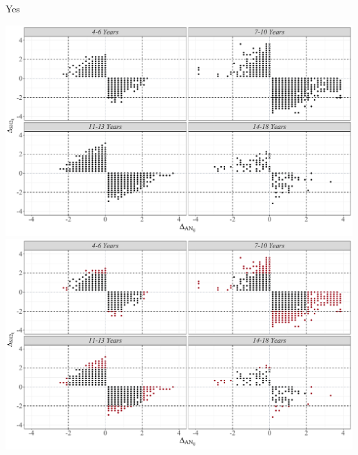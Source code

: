 \documentclass{beamer}
\begin{document}
\begin{frame}{Yes}
	\begin{overprint}
		
		\includegraphics[width=\linewidth]{img/farfalle_gruppi.pdf}
		\onslide<2>\includegraphics[width=\linewidth]{img/farfalle_gruppi_colored.pdf}

		
		
	\end{overprint}
\end{frame}
\end{document}
